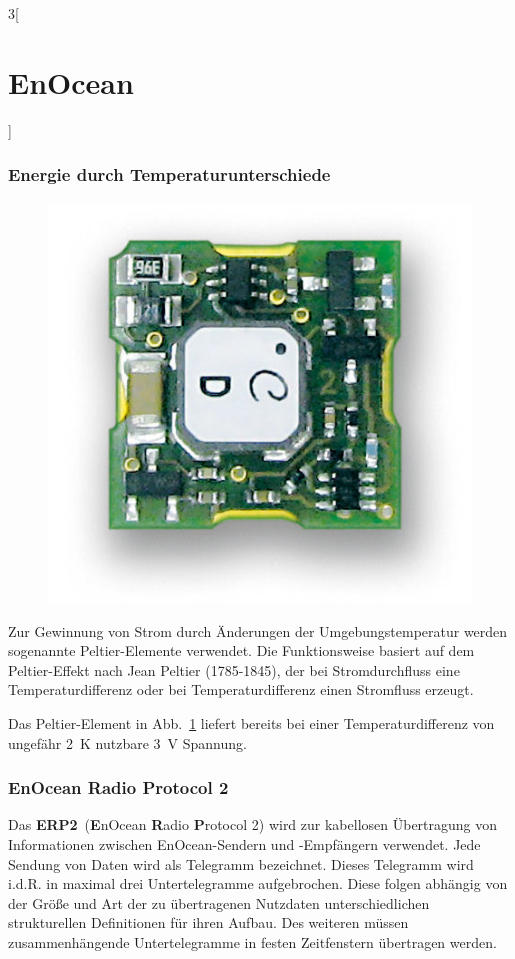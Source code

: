 \begin{multicols}{3}[\section{EnOcean}]
\subsubsection*{Energie durch Temperaturunterschiede}
\begin{figure}
  \vspace{-20pt}
  \begin{center}
  	\hspace{-10pt}
    \includegraphics[width=1\linewidth]{Kapitel/EnOcean/Grafiken/EnOceanECT310.jpg}
    \label{fig:enocean.ect310}
  \end{center}
  \vspace{-15pt}
\end{figure}
Zur Gewinnung von Strom durch Änderungen der Umgebungstemperatur werden sogenannte Peltier-Elemente verwendet. Die Funktionsweise basiert auf dem Peltier-Effekt nach Jean Peltier (1785-1845), der bei Stromdurchfluss eine Temperaturdifferenz oder bei Temperaturdifferenz einen Stromfluss erzeugt.~\cite{enocean.4}

Das Peltier-Element in Abb.~\ref{fig:enocean.ect310} liefert bereits bei einer Temperaturdifferenz von ungefähr \SI{2}{K} nutzbare \SI{3}{V} Spannung.~\cite{enocean.1}

\subsubsection*{EnOcean Radio Protocol 2}
Das \textbf{ERP2}~(\textbf{E}nOcean \textbf{R}adio \textbf{P}rotocol 2) wird zur kabellosen Übertragung von Informationen zwischen EnOcean-Sendern und -Empfängern verwendet. Jede Sendung von Daten wird als Telegramm bezeichnet. Dieses Telegramm wird i.d.R. in maximal drei Untertelegramme aufgebrochen. Diese folgen abhängig von der Größe und Art der zu übertragenen Nutzdaten unterschiedlichen strukturellen Definitionen für ihren Aufbau. Des weiteren müssen zusammenhängende Untertelegramme in festen Zeitfenstern übertragen werden.


\end{multicols}
